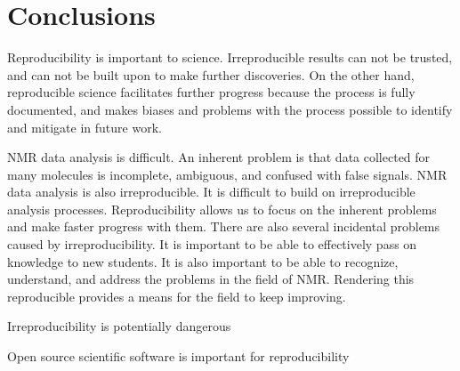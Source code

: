 \chapter{Conclusions}

Reproducibility is important to science.  Irreproducible results can not be 
trusted, and can not be built upon to make further discoveries.
On the other hand, reproducible science facilitates further progress because
the process is fully documented, and makes biases and problems with the process
possible to identify and mitigate in future work.

NMR data analysis is difficult.  An inherent problem is that data collected 
for many molecules is incomplete, ambiguous, and confused with false signals.
NMR data analysis is also irreproducible.
It is difficult to build on irreproducible analysis processes.
Reproducibility allows us to focus on the inherent problems and make faster progress with them.
There are also several incidental problems caused by irreproducibility.
It is important to be able to effectively pass on knowledge to new students.
It is also important to be able to recognize, understand, and address the problems in the field of NMR.
Rendering this reproducible provides a means for the field to keep improving.

Irreproducibility is potentially dangerous

Open source scientific software is important for reproducibility
